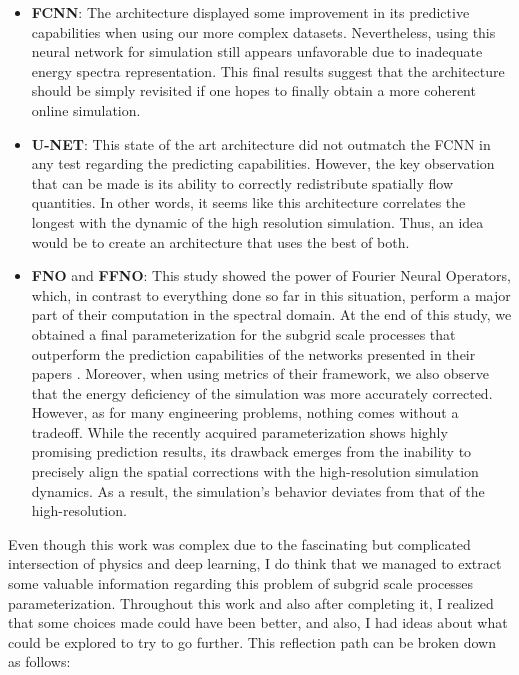 \vspace{1em}
\begin{itemize}
	\item \textbf{FCNN}: The architecture displayed some improvement in its predictive capabilities when using our more complex datasets. Nevertheless, using this neural network for simulation still appears unfavorable due to inadequate energy spectra representation. This final results suggest that the architecture should be simply revisited if one hopes to finally obtain a more coherent online simulation.

	\vspace{1em}
	\item \textbf{U-NET}: This state of the art architecture did not outmatch the FCNN in any test regarding the predicting capabilities. However, the key observation that can be made is its ability to correctly redistribute spatially flow quantities. In other words, it seems like this architecture correlates the longest with the dynamic of the high resolution simulation. Thus, an idea would be to create an architecture that uses the best of both.
	
	\vspace{1em}
	\item \textbf{FNO} and \textbf{FFNO}: This study showed the power of Fourier Neural Operators, which, in contrast to everything done so far in this situation, perform a major part of their computation in the spectral domain. At the end of this study, we obtained a final parameterization for the subgrid scale processes that outperform the prediction capabilities of the networks presented in their papers \cite{Benchmarking}. Moreover, when using metrics of their framework, we also observe that the energy deficiency of the simulation was more accurately corrected. However, as for many engineering problems, nothing comes without a tradeoff. While the recently acquired parameterization shows highly promising prediction results, its drawback emerges from the inability to precisely align the spatial corrections with the high-resolution simulation dynamics. As a result, the simulation's behavior deviates from that of the high-resolution.
	
\end{itemize}

\newpage


Even though this work was complex due to the fascinating but complicated intersection of physics and deep learning, I do think that we managed to extract some valuable information regarding this problem of subgrid scale processes parameterization. Throughout this work and also after completing it, I realized that some choices made could have been better, and also, I had ideas about what could be explored to try to go further. This reflection path can be broken down as follows:

